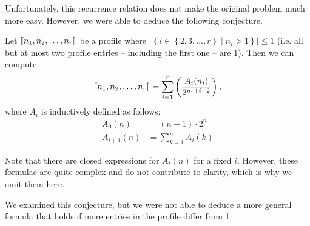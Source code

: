Unfortunately, this recurrence relation does not make the original problem much more easy. However, we were able to deduce the following conjecture.

\begin{conjecture}
  Let $\llbracket n_1,n_2,\dots,n_r \rrbracket$ be a profile where 
  $\left|\left\{ i \in \left\{ 2,3,\dots,r \right\} \mid n_i > 1 \right\}\right| \leq 1$ 
  (i.e. all but at most two profile entries -- including the first one -- are 1).
  Then we can compute 
  \begin{equation*}
    \llbracket n_1,n_2,\dots,n_r \rrbracket = \sum_{i=1}^r \left( \frac{A_i(n_i)}{2^{n_i+i-2}} \right),
  \end{equation*}
  where $A_i$ is inductively defined as follows:
  \begin{align*}
    A_0(n) & = (n+1) \cdot 2^n \\
    A_{i+1}(n) & = \sum_{k=1}^n A_{i}(k)
  \end{align*}
\end{conjecture}

Note that there are closed expressions for $A_i(n)$ for a fixed $i$. However, these formulae are quite complex and do not contribute to clarity, which is why we omit them here.

We examined this conjecture, but we were not able to deduce a more general formula that holds if more entries in the profile differ from 1.

